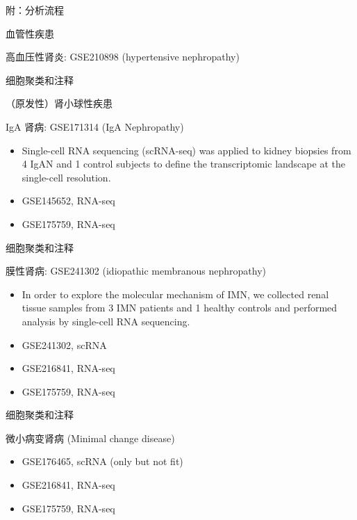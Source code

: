 \documentclass[
  ignorenonframetext,
]{beamer}
\providecommand{\tightlist}{%
  \setlength{\itemsep}{0pt}\setlength{\parskip}{0pt}}
\begin{document}
\begin{frame}[fragile]{附：分析流程}
\begin{block}{血管性疾患}
\begin{block}{高血压性肾炎: GSE210898 (hypertensive nephropathy)}
\begin{block}{细胞聚类和注释}
\protect\hypertarget{ux7ec6ux80deux805aux7c7bux548cux6ce8ux91ca-1}{}
\end{block}
\end{block}
\end{block}

\begin{block}{（原发性）肾小球性疾患}
\protect\hypertarget{ux539fux53d1ux6027ux80beux5c0fux7403ux6027ux75beux60a3}{}
\begin{block}{IgA 肾病: GSE171314 (IgA Nephropathy)}
\protect\hypertarget{iga-ux80beux75c5-gse171314-iga-nephropathy}{}
\begin{itemize}
\item
  Single-cell RNA sequencing (scRNA-seq) was applied to kidney biopsies
  from 4 IgAN and 1 control subjects to define the transcriptomic
  landscape at the single-cell resolution.
\item
  GSE145652, RNA-seq
\item
  GSE175759, RNA-seq
\end{itemize}

\begin{block}{细胞聚类和注释}
\protect\hypertarget{ux7ec6ux80deux805aux7c7bux548cux6ce8ux91ca-2}{}
\end{block}
\end{block}

\begin{block}{膜性肾病: GSE241302 (idiopathic membranous nephropathy)}
\protect\hypertarget{ux819cux6027ux80beux75c5-gse241302-idiopathic-membranous-nephropathy}{}
\begin{itemize}
\item
  In order to explore the molecular mechanism of IMN, we collected renal
  tissue samples from 3 IMN patients and 1 healthy controls and
  performed analysis by single-cell RNA sequencing.
\item
  GSE241302, scRNA
\item
  GSE216841, RNA-seq
\item
  GSE175759, RNA-seq
\end{itemize}

\begin{block}{细胞聚类和注释}
\protect\hypertarget{ux7ec6ux80deux805aux7c7bux548cux6ce8ux91ca-3}{}
\end{block}
\end{block}

\begin{block}{微小病变肾病 (Minimal change disease)}
\protect\hypertarget{ux5faeux5c0fux75c5ux53d8ux80beux75c5-minimal-change-disease}{}
\begin{itemize}
\tightlist
\item
  GSE176465, scRNA (only but not fit)
\item
  GSE216841, RNA-seq
\item
  GSE175759, RNA-seq
\end{itemize}
\end{block}
\end{block}


\end{frame}
\end{document}

